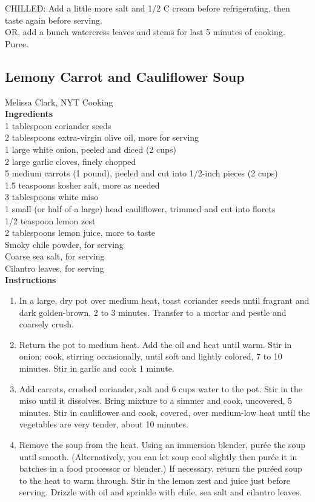 \documentclass{article}
\numberwithin{figure}{section}
\numberwithin{equation}{section}
\begin{document}
CHILLED:  Add a little more salt  and 1/2 C cream before refrigerating, then taste again before serving.\\
OR, add a bunch watercress leaves and stems for last 5 minutes of cooking.  Puree.




\pagebreak
\subsection{Lemony Carrot and Cauliflower Soup}
Melissa Clark, NYT Cooking\\

{\bf Ingredients}\\
1 tablespoon coriander seeds\\
2 tablespoons extra-virgin olive oil, more for serving\\
1 large white onion, peeled and diced (2 cups)\\
2 large garlic cloves, finely chopped\\
5 medium carrots (1 pound), peeled and cut into 1/2-inch pieces (2 cups)\\
1.5 teaspoons kosher salt, more as needed\\
3 tablespoons white miso\\
1 small (or half of a large) head cauliflower, trimmed and cut into florets\\
1/2 teaspoon lemon zest\\
2 tablespoons lemon juice, more to taste\\
Smoky chile powder, for serving\\
Coarse sea salt, for serving\\
Cilantro leaves, for serving\\

{\bf Instructions}
\begin{enumerate}
\item In a large, dry pot over medium heat, toast coriander seeds until fragrant and dark golden-brown, 2 to 3 minutes. Transfer to a mortar and pestle and coarsely crush.
\item Return the pot to medium heat. Add the oil and heat until warm. Stir in onion; cook, stirring occasionally, until soft and lightly colored, 7 to 10 minutes. Stir in garlic and cook 1 minute.
\item Add carrots, crushed coriander, salt and 6 cups water to the pot. Stir in the miso until it dissolves. Bring mixture to a simmer and cook, uncovered, 5 minutes. Stir in cauliflower and cook, covered, over medium-low heat until the vegetables are very tender, about 10 minutes.
\item Remove the soup from the heat. Using an immersion blender, purée the soup until smooth. (Alternatively, you can let soup cool slightly then purée it in batches in a food processor or blender.) If necessary, return the puréed soup to the heat to warm through. Stir in the lemon zest and juice just before serving. Drizzle with oil and sprinkle with chile, sea salt and cilantro leaves.
\end{enumerate}
\end{document}
